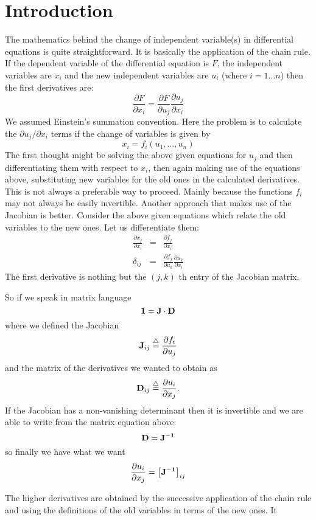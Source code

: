 \section{Introduction}
The mathematics behind the change of independent variable(s) in differential
equations is quite straightforward. It is basically the application of the
chain rule. If the dependent variable of the differential equation is $F$,
the independent variables are $x_{i}$ and the new independent variables are
$u_{i}$ (where ${\scriptstyle i=1\ldots n}$) then the first derivatives are:
\[
    \frac{\partial F}{\partial x_{i}} = \frac{\partial F}{\partial u_{j}}
                                        \frac{\partial u_{j}}{\partial x_{i}}
\]
We assumed Einstein's summation convention. Here the problem is to
calculate the $\partial u_{j}/\partial x_{i}$ terms if the change of variables
is given by
\[
    x_{i} = f_{i}(u_{1},\ldots,u_{n})
\]
The first thought might be solving the above given equations for $u_{j}$ and
then differentiating them with respect to $x_{i}$, then again making use of the
equations above, substituting new variables for the old ones in the calculated
derivatives. This is not always a  preferable way to proceed. Mainly because
the functions $f_{i}$ may not always be easily invertible. Another approach
that makes use of the Jacobian is better. Consider the above given equations
which relate the old variables to the new ones. Let us differentiate them:
\begin{eqnarray*}
  \frac{\partial x_{j}}{\partial x_{i}} & = &
        \frac{\partial f_{j}}{\partial x_{i}}   \\
  \delta_{ij} & = &
        \frac{\partial f_{j}}{\partial u_{k}}
        \frac{\partial u_{k}}{\partial x_{i}}
\end{eqnarray*}
The first derivative is nothing but the $(j,k)$ th entry of the Jacobian matrix.

So if we speak in matrix language
\[ {\bf 1 = J \cdot D} \]
where we defined the Jacobian
\[ {\bf J}_{ij} \stackrel{\triangle}{=}  \frac{\partial f_{i}}{\partial u_{j}} \]
and the matrix of the derivatives we wanted to obtain as
\[ {\bf D}_{ij} \stackrel{\triangle}{=}  \frac{\partial u_{i}}{\partial x_{j}}. \]
If the Jacobian has a non-vanishing determinant then it is invertible and
we are able to write from the matrix equation above:
\[ {\bf  D = J^{-1}} \]
so finally we have what we want
\[
   \frac{\partial u_{i}}{\partial x_{j}} = \left[{\bf J^{-1}}\right]_{ij}
\]

The higher derivatives are obtained by the successive application of the chain
rule and using the definitions of the old variables in terms of the new ones. It

